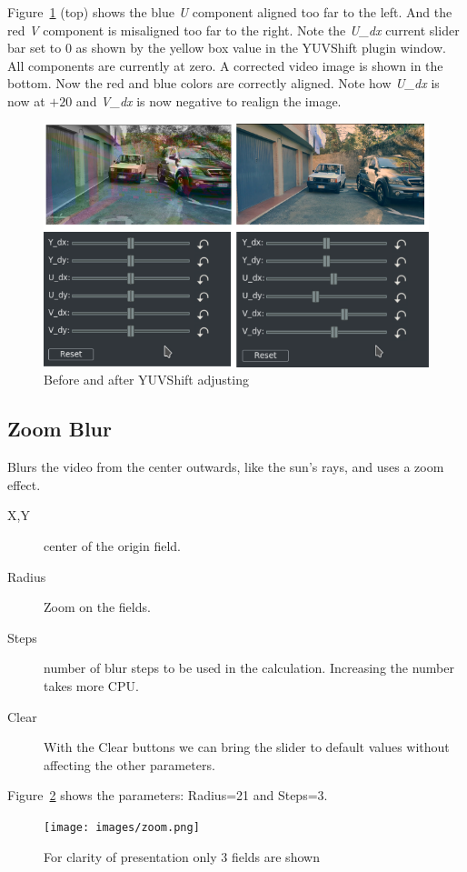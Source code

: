 {Figure~\ref{fig:yuvshift} (top) shows the blue \textit{U} component aligned too far to the left. And the red \textit{V} component is misaligned too far to the right. Note the \textit{U\_dx} current slider bar set to $0$ as shown by the yellow box value in the YUVShift plugin window. All components are currently at zero.
A corrected video image is shown in the bottom. Now the red and blue colors are correctly aligned. Note how \textit{U\_dx} is now at $+20$ and \textit{V\_dx} is now negative to realign the image.

\begin{figure}[hbtp]
    \centering
    \includegraphics[width=0.7\linewidth]{images/yuvshift.png}
    \caption{Before and after YUVShift adjusting}
    \label{fig:yuvshift}
\end{figure}

\subsection{Zoom Blur}%
\label{sub:zoom_blur}

Blurs the video from the center outwards, like the sun’s rays, and uses a zoom effect.

\begin{description}
    \item[X,Y] center of the origin field.
    \item[Radius] Zoom on the fields.
    \item[Steps] number of blur steps to be used in the calculation. Increasing the number takes more CPU.
    \item[Clear] With the Clear buttons we can bring the slider to default values without affecting the other parameters.
\end{description}

Figure~\ref{fig:zoom} shows the parameters: Radius=21 and Steps=3.

\begin{figure}[hbtp]
    \centering
    \texttt{[image: images/zoom.png]}
    \caption{For clarity of presentation only 3 fields are shown}
    \label{fig:zoom}
\end{figure}

}
